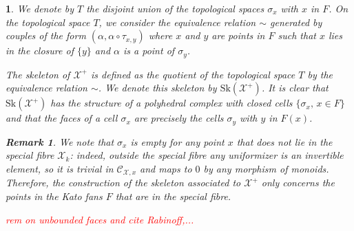 \documentclass{amsart}%
\numberwithin{equation}{subsection}
\theoremstyle{plain2}
\theoremstyle{definition2}
\newtheorem{rem}[equation]{Remark}
\theoremstyle{stepstyle}
\theoremstyle{point}
\theoremstyle{subpoint}
\newtheorem{subpoint}[equation]{}%
\newcommand{\spa}[1]{\begin{subpoint}#1\end{subpoint}}           %
\newcommand{\cX}{\ensuremath{\mathscr{X}}}
\newcommand{\caC}{\ensuremath{\mathcal{C}}}
\newcommand{\Sk}{\mathrm{Sk}}
\begin{document}
\spa{We denote by $T$ the disjoint union of the topological
spaces $\sigma_x$ with $x$ in $F$. On the topological space $T$, we consider the equivalence relation $\sim$ generated by couples of the form $(\alpha,\alpha\circ \tau_{x,y})$ where $x$ and $y$ are points in $F$ such that $x$ lies in the closure of $\{y\}$ and $\alpha$ is a point of $\sigma_y$.

The skeleton of $\cX^+$ is defined as the quotient of the topological space $T$ by the equivalence relation $\sim$. We denote this skeleton by $\Sk(\cX^+)$. It is clear that $\Sk(\cX^+)$ has the structure of a polyhedral complex with closed cells $\{\sigma_x,\,x\in F\}$ and that the faces of a cell $\sigma_x$ are precisely the cells $\sigma_y$ with $y$ in $F(x)$. 

\begin{rem} \label{rem points in kato fan and skeleton}
We note that $\sigma_x$ is empty for any point $x$ that does not lie in the special fibre $\cX_k$: indeed, outside the special fibre any uniformizer is an invertible element, so it is trivial in $\caC_{\cX,x}$ and maps to $0$ by any morphism of monoids. Therefore, the construction of the skeleton associated to $\cX^+$ only concerns the points in the Kato fans $F$ that are in the special fibre. 
\end{rem}

\textcolor{red}{rem on unbounded faces and cite Rabinoff,...}
}
 
\end{document}

